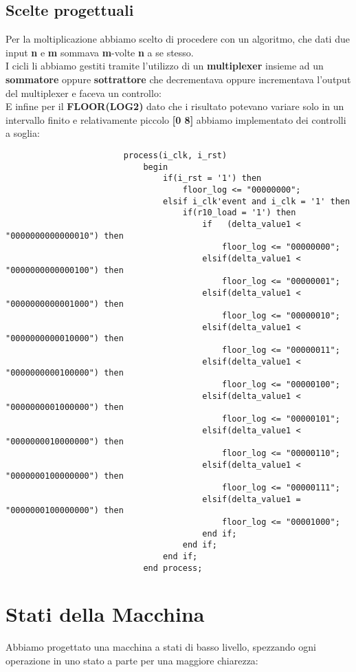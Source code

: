 \documentclass[a4paper, 12pt]{report}
\begin{document}
			\subsection{Scelte progettuali}
				Per la moltiplicazione abbiamo scelto di procedere con un algoritmo, che dati due input \textbf{n} e \textbf{m} sommava \textbf{m}-volte \textbf{n} a se stesso.\\
				I cicli li abbiamo gestiti tramite l'utilizzo di un \textbf{multiplexer} insieme ad un \textbf{sommatore} oppure \textbf{sottrattore} che decrementava oppure incrementava l'output del multiplexer e faceva un controllo:\\
				E infine per il \textbf{FLOOR(LOG2)} dato che i risultato potevano variare solo in un intervallo finito e relativamente piccolo \textbf{[0 8]} abbiamo implementato dei controlli a soglia:\\
					\begin{lstlisting}
						process(i_clk, i_rst)
						    begin
						        if(i_rst = '1') then
						            floor_log <= "00000000";
						        elsif i_clk'event and i_clk = '1' then
						            if(r10_load = '1') then
						                if   (delta_value1 < "0000000000000010") then
						                    floor_log <= "00000000";
						                elsif(delta_value1 < "0000000000000100") then
						                    floor_log <= "00000001";
						                elsif(delta_value1 < "0000000000001000") then
						                    floor_log <= "00000010";
						                elsif(delta_value1 < "0000000000010000") then
						                    floor_log <= "00000011";
						                elsif(delta_value1 < "0000000000100000") then
						                    floor_log <= "00000100";
						                elsif(delta_value1 < "0000000001000000") then
						                    floor_log <= "00000101";
						                elsif(delta_value1 < "0000000010000000") then
						                    floor_log <= "00000110";
						                elsif(delta_value1 < "0000000100000000") then
						                    floor_log <= "00000111";
						                elsif(delta_value1 = "0000000100000000") then
						                    floor_log <= "00001000";
						                end if;
						            end if;
						        end if;
						    end process;    
					\end{lstlisting}
		\section{Stati della Macchina}
			Abbiamo progettato una macchina a stati di basso livello, spezzando ogni operazione in uno stato a parte per una maggiore chiarezza:\\
			
\end{document}

